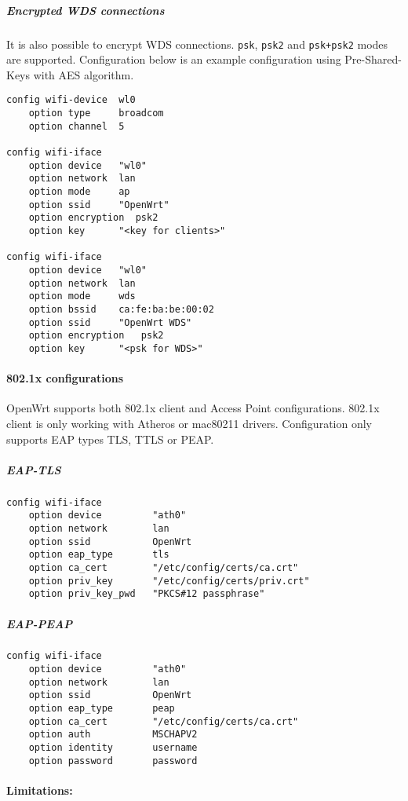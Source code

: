 \subparagraph{Encrypted WDS connections}

It is also possible to encrypt WDS connections. \texttt{psk}, \texttt{psk2} and
\texttt{psk+psk2} modes are supported. Configuration below is an example
configuration using Pre-Shared-Keys with AES algorithm.

\begin{Verbatim}
config wifi-device  wl0
    option type     broadcom
    option channel  5

config wifi-iface
    option device   "wl0"
    option network  lan
    option mode     ap
    option ssid     "OpenWrt"
    option encryption  psk2
    option key      "<key for clients>"

config wifi-iface
    option device   "wl0"
    option network  lan
    option mode     wds
    option bssid    ca:fe:ba:be:00:02
    option ssid     "OpenWrt WDS"
    option encryption	psk2
    option key      "<psk for WDS>"
\end{Verbatim}

\paragraph{802.1x configurations}

OpenWrt supports both 802.1x client and Access Point
configurations. 802.1x client is only working with
Atheros or mac80211 drivers. Configuration only
supports EAP types TLS, TTLS or PEAP.

\subparagraph{EAP-TLS}

\begin{Verbatim}
config wifi-iface
    option device         "ath0"
    option network        lan
    option ssid           OpenWrt
    option eap_type       tls
    option ca_cert        "/etc/config/certs/ca.crt"
    option priv_key       "/etc/config/certs/priv.crt"
    option priv_key_pwd   "PKCS#12 passphrase"
\end{Verbatim}

\subparagraph{EAP-PEAP}

\begin{Verbatim}
config wifi-iface
    option device         "ath0"
    option network        lan
    option ssid           OpenWrt
    option eap_type       peap
    option ca_cert        "/etc/config/certs/ca.crt"
    option auth           MSCHAPV2
    option identity       username
    option password       password
\end{Verbatim}

\paragraph{Limitations:}

